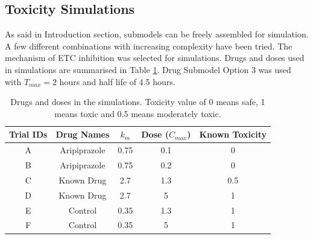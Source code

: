 \documentclass[12pt]{article}
\begin{document}
\subsection{Toxicity Simulations}
As said in Introduction section, submodels can be freely assembled for simulation. A few different combinations with increasing complexity have been tried. The mechanism of ETC inhibition was selected for simulations. Drugs and doses used in simulations are summarised in Table \ref{tab:drug}. Drug Submodel Option 3 was used with $T_{max}=2$ hours and half life of 4.5 hours.
\begin{table}
\centering
\begin{tabular}{|c|c| c| c| c |} 
 \hline
 \textbf{Trial IDs} & \textbf{Drug Names} & \textbf{$k_m$} & \textbf{Dose ($C_{max}$)} & \textbf{Known Toxicity}\\
 \hline\hline
A &Aripiprazole & 0.75 & 0.1 & 0 \\
\hline
B &Aripiprazole & 0.75 & 0.2 & 0 \\
\hline
C &Known Drug & 2.7 & 1.3 & 0.5 \\
\hline
D &Known Drug & 2.7 & 5 &  1\\
\hline
E &Control & 0.35 & 1.3 & 1 \\
\hline
F& Control & 0.35 & 5 &  1\\
\hline

\end{tabular}
\caption{Drugs and doses in the simulations. Toxicity value of 0 means safe, 1 means toxic and 0.5 means moderately toxic.}
\label{tab:drug}
\end{table}
\end{document}

